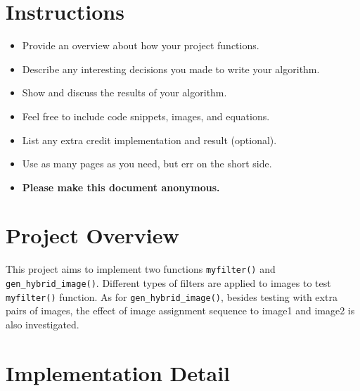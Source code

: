 \section*{Instructions}
\begin{itemize}
  \item Provide an overview about how your project functions. 
  \item Describe any interesting decisions you made to write your algorithm.
  \item Show and discuss the results of your algorithm.
  \item Feel free to include code snippets, images, and equations.
  \item List any extra credit implementation and result (optional).
  \item Use as many pages as you need, but err on the short side.
  \item \textbf{Please make this document anonymous.}
\end{itemize}

\section*{Project Overview}

This project aims to implement two functions \verb|myfilter()| and \verb|gen_hybrid_image()|. Different types of filters are applied to images to test \verb|myfilter()| function. As for \verb|gen_hybrid_image()|, besides testing with extra pairs of images, the effect of image assignment sequence to image1 and image2 is also investigated.

\section*{Implementation Detail}

